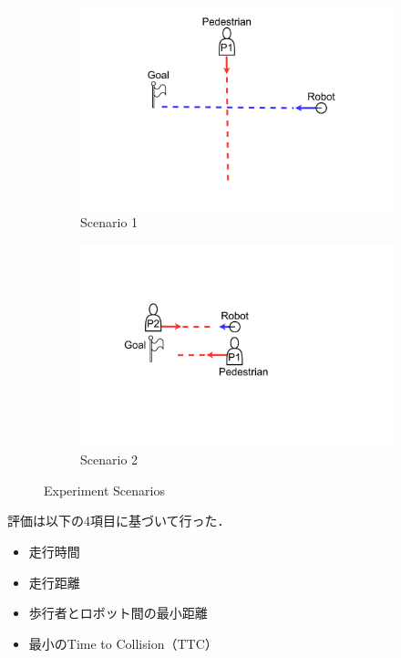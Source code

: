 \begin{figure}[H]
  \centering
  \begin{subfigure}{0.80\textwidth}
    \centering
    \includegraphics[keepaspectratio, scale=0.15]{images/scenario1.pdf}
    \caption{Scenario 1}
    \label{Fig:scenario1}
  \end{subfigure}
  \vspace{10pt}
  \begin{subfigure}{0.80\textwidth}
    \centering
    \includegraphics[keepaspectratio, scale=0.15]{images/scenario2.pdf}
    \caption{Scenario 2}
    \label{Fig:scenario2}
  \end{subfigure}
  \caption{Experiment Scenarios}
  \label{Fig:experiment-scenarios}
\end{figure}

\newpage

評価は以下の4項目に基づいて行った．
\begin{itemize}
  \item 走行時間
  \item 走行距離
  \item 歩行者とロボット間の最小距離
  \item 最小のTime to Collision（TTC）
\end{itemize}

